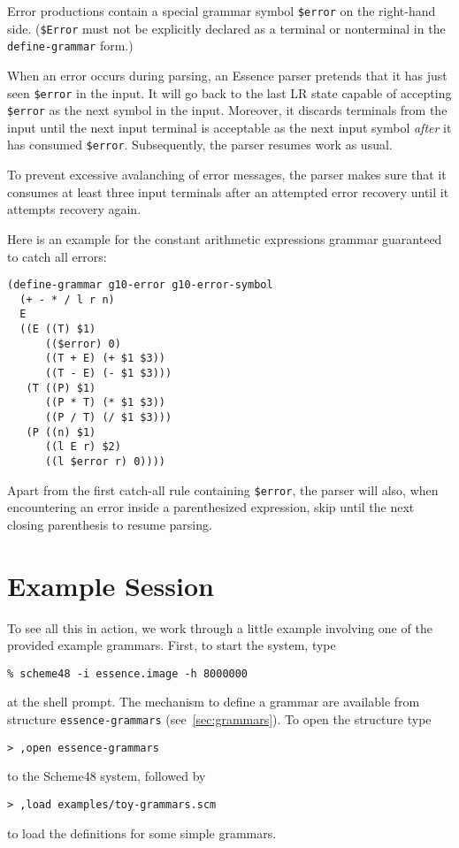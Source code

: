 \documentclass{article}
\newcommand{\codefont}[1]{\texttt{#1}}
\begin{document}
Error productions contain a special grammar symbol \codefont{\$error}
on the right-hand side.  (\codefont{\$Error} must not be explicitly
declared as a terminal or nonterminal in the \codefont{define-grammar}
form.)

When an error occurs during parsing, an Essence parser pretends that
it has just seen \codefont{\$error} in the input.  It will go back to
the last LR state capable of accepting \codefont{\$error} as the next
symbol in the input.  Moreover, it discards terminals from the input
until the next input terminal is acceptable as the next input symbol
\emph{after} it has consumed \codefont{\$error}.  Subsequently, the
parser resumes work as usual.

To prevent excessive avalanching of error messages, the parser makes
sure that it consumes at least three input terminals after an
attempted error recovery until it attempts recovery again.

Here is an example for the constant arithmetic expressions grammar
guaranteed to catch all errors:
%
\begin{verbatim}
(define-grammar g10-error g10-error-symbol
  (+ - * / l r n)
  E
  ((E ((T) $1)
      (($error) 0)
      ((T + E) (+ $1 $3))
      ((T - E) (- $1 $3)))
   (T ((P) $1)
      ((P * T) (* $1 $3))
      ((P / T) (/ $1 $3)))
   (P ((n) $1)
      ((l E r) $2)
      ((l $error r) 0))))
\end{verbatim}
%
Apart from the first catch-all rule containing \codefont{\$error}, the
parser will also, when encountering an error inside a parenthesized
expression, skip until the next closing parenthesis to resume parsing.


\section{Example Session}
\label{sec:example-session}

To see all this in action, we work through a little example involving one of
the provided example grammars. First, to start the system, type
\begin{verbatim}
% scheme48 -i essence.image -h 8000000
\end{verbatim}
at the shell prompt. The mechanism to define a grammar are available from
structure \codefont{essence-grammars} (see~\ref{sec:grammars}). To open the structure
type
\begin{verbatim}
> ,open essence-grammars
\end{verbatim}
to the Scheme48 system, followed by
\begin{verbatim}
> ,load examples/toy-grammars.scm
\end{verbatim}
to load the definitions for some simple grammars.
\end{document}
